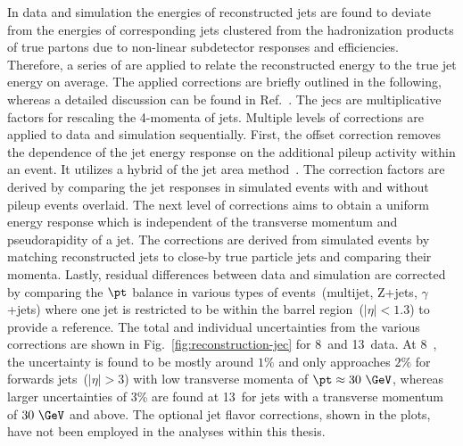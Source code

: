 In data and simulation the energies of reconstructed jets are found to deviate from the energies of corresponding jets clustered from the hadronization products of true partons due to non-linear subdetector responses and efficiencies. Therefore, a series of  are applied to relate the reconstructed energy to the true jet energy on average. The applied corrections are briefly outlined in the following, whereas a detailed discussion can be found in Ref.~\cite{Khachatryan:2016kdb}. The \glspl{jec} are multiplicative factors for rescaling the 4-momenta of jets. Multiple levels of corrections are applied to data and simulation sequentially. First, the offset correction removes the dependence of the jet energy response on the additional pileup activity within an event. It utilizes a hybrid of the jet area method~\cite{Cacciari:2007fd}. The correction factors are derived by comparing the jet responses in simulated events with and without pileup events overlaid. The next level of corrections aims to obtain a uniform energy response which is independent of the transverse momentum and pseudorapidity of a jet. The corrections are derived from simulated events by matching reconstructed jets to close-by true particle jets and comparing their momenta. Lastly, residual differences between data and simulation are corrected by comparing the $\pt$ balance in various  types of events~(multijet, \mbox{$\mathrm{Z}$+jets}, \mbox{$\gamma$+jets}) where one jet is restricted to be within the barrel region~($|\eta|<1.3$) to provide a reference. The total and individual uncertainties from the various corrections are shown in Fig.~\ref{fig:reconstruction-jec} for 8~\TeV and 13~\TeV data. At 8~\TeV, the uncertainty is found to be mostly around $1\%$ and only approaches $2\%$ for forwards jets~($|\eta|>3$) with low transverse momenta of $\pt\approx30~\GeV$, whereas larger uncertainties of 3\% are found at 13~\TeV for jets with a transverse momentum of $30~\GeV$ and above. The optional jet flavor corrections, shown in the plots, have not been employed in the analyses within this thesis.

